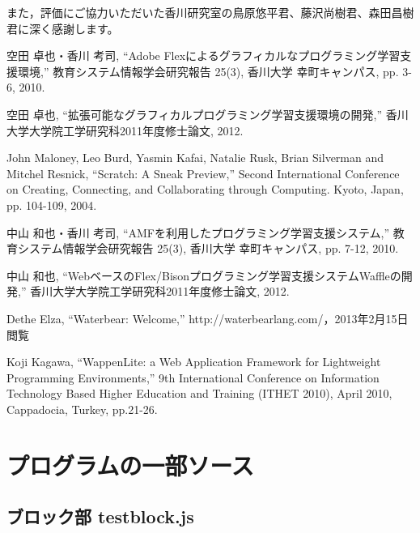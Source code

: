 \documentclass{risepaper}
\begin{document}
また，評価にご協力いただいた香川研究室の鳥原悠平君、藤沢尚樹君、森田昌樹君に深く感謝します。

\begin{thebibliography}{99} %
                                  
 空田 卓也・香川 考司, 
 ``Adobe Flexによるグラフィカルなプログラミング学習支援環境,'' 
 教育システム情報学会研究報告 25(3), 香川大学 幸町キャンパス, pp. 3-6, 2010.

 空田 卓也, 
 ``拡張可能なグラフィカルプログラミング学習支援環境の開発,'' 
 香川大学大学院工学研究科2011年度修士論文, 2012.

 John Maloney, Leo Burd, Yasmin Kafai, Natalie Rusk, Brian Silverman and Mitchel Resnick,
 ``Scratch: A Sneak Preview,''
 Second International Conference on Creating, Connecting, and Collaborating through 
 Computing. Kyoto, Japan, pp. 104-109, 2004.

 中山 和也・香川 考司,
 ``AMFを利用したプログラミング学習支援システム,'' 
 教育システム情報学会研究報告 25(3), 香川大学 幸町キャンパス, pp. 7-12, 2010.

 中山 和也,
 ``WebベースのFlex/Bisonプログラミング学習支援システムWaffleの開発,'' 
 香川大学大学院工学研究科2011年度修士論文, 2012.

 Dethe Elza, ``Waterbear: Welcome,''
 http://waterbearlang.com/，2013年2月15日閲覧

 Koji Kagawa, ``WappenLite: a Web Application Framework for Lightweight Programming Environments,''
  9th International Conference on Information Technology Based Higher Education and Training (ITHET 2010),
  April 2010, Cappadocia, Turkey, pp.21-26.

\end{thebibliography}

\appendix         %
\chapter{プログラムの一部ソース}

\section{ブロック部 testblock.js}
\end{document}
